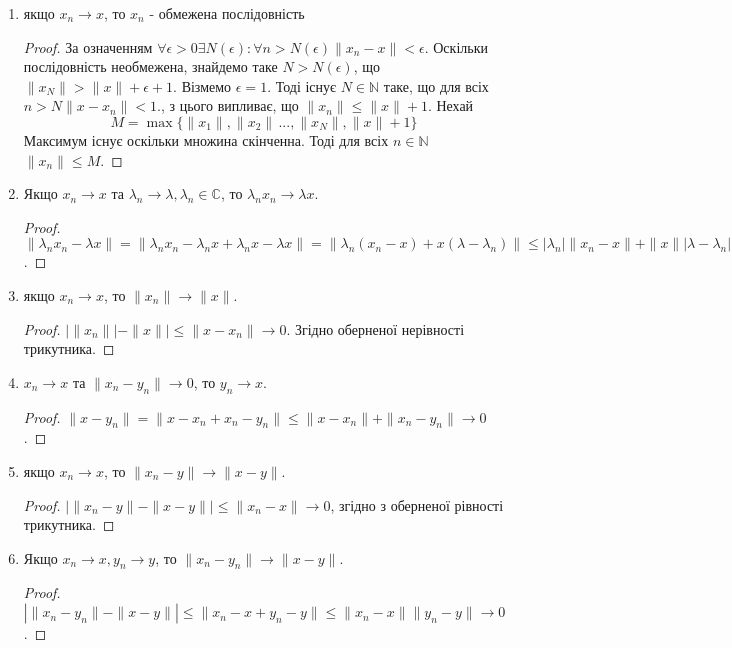 \documentclass[a4paper,12pt,twoside]{book}
\begin{document}
\begin{enumerate}
    \item якщо $x_n \rightarrow x$, то $x_n$ - обмежена послідовність
    \begin{proof}
        За означенням $\forall \epsilon > 0 \exists N(\epsilon): \forall n > N(\epsilon) \|x_n - x\| < \epsilon$. Оскільки послідовність необмежена, знайдемо таке $N > N(\epsilon)$, що $\|x_N\| > \|x\| + \epsilon + 1$. Візмемо $\epsilon = 1$. Тоді існує $N \in \mathbb{N}$ таке, що для всіх $n > N \|x - x_n\| < 1.$, з цього випливає, що $\|x_n\| \leq \|x\| + 1$. Нехай
        \begin{equation}
            M = \max \{\|x_1\|,\|x_2\|\, ..., \|x_N\|, \|x\| + 1\}
        \end{equation}
    Максимум існує оскільки множина скінченна. Тоді для всіх $n \in \mathbb{N}$ $\|x_n\|\leq M$.
    \end{proof}
    \item Якщо $x_n \rightarrow x$ та $\lambda_n \rightarrow \lambda, \lambda_n \in \mathbb{C}$, то $\lambda_n x_n \rightarrow \lambda x$.
    
    \begin{proof}
      $  \|\lambda_n x_n  - \lambda x\| = \|\lambda_n x_n -\lambda_n x + \lambda_n x - \lambda x\| = \|\lambda_n (x_n - x) + x(\lambda - \lambda_n)\| \leq |\lambda_n|\|x_n - x\| + \|x\||\lambda - \lambda_n| \rightarrow 0$. 
    \end{proof}
    \item якщо $x_n \rightarrow x$, то $\|x_n\| \rightarrow \|x\|$.
    \begin{proof}
        $|\|x_n\|| - \|x\|| \leq \|x - x_n\| \rightarrow 0$. Згідно оберненої нерівності трикутника.
    \end{proof}
    \item $x_n \rightarrow x$ та $\|x_n - y_n\| \rightarrow 0$, то $y_n \rightarrow x$.
    \begin{proof}
        $\|x - y_n\| = \|x - x_n + x_n - y_n\| \leq \|x - x_n\| + \|x_n - y_n\| \rightarrow 0$.
    \end{proof}
    \item якщо $x_n \rightarrow x$, то $\|x_n - y\| \rightarrow \|x - y\|$.
    \begin{proof}
        $|\|x_n - y\| - \|x - y\|| \leq \|x_ n - x\| \rightarrow 0$, згідно з оберненої рівності трикутника.
    \end{proof} 
    \item Якщо $x_n \rightarrow x, y_n \rightarrow y$, то $\|x_n - y_n\| \rightarrow \|x - y\|$.
    \begin{proof}
        $|\|x_n - y_n\| - \|x - y\|| \leq \|x_n - x + y_n - y\| \leq \|x_n - x\| \|y_n - y\| \rightarrow 0$.
    \end{proof}
\end{enumerate}
\end{document}
